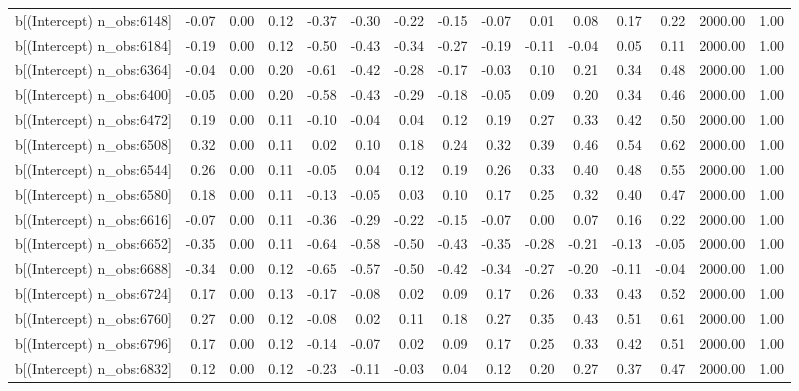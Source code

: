 \begin{table}[ht]
\begin{tabular}{rrrrrrrrrrrrrrr}
  b[(Intercept) n\_obs:6148] & -0.07 & 0.00 & 0.12 & -0.37 & -0.30 & -0.22 & -0.15 & -0.07 & 0.01 & 0.08 & 0.17 & 0.22 & 2000.00 & 1.00 \\ 
  b[(Intercept) n\_obs:6184] & -0.19 & 0.00 & 0.12 & -0.50 & -0.43 & -0.34 & -0.27 & -0.19 & -0.11 & -0.04 & 0.05 & 0.11 & 2000.00 & 1.00 \\ 
  b[(Intercept) n\_obs:6364] & -0.04 & 0.00 & 0.20 & -0.61 & -0.42 & -0.28 & -0.17 & -0.03 & 0.10 & 0.21 & 0.34 & 0.48 & 2000.00 & 1.00 \\ 
  b[(Intercept) n\_obs:6400] & -0.05 & 0.00 & 0.20 & -0.58 & -0.43 & -0.29 & -0.18 & -0.05 & 0.09 & 0.20 & 0.34 & 0.46 & 2000.00 & 1.00 \\ 
  b[(Intercept) n\_obs:6472] & 0.19 & 0.00 & 0.11 & -0.10 & -0.04 & 0.04 & 0.12 & 0.19 & 0.27 & 0.33 & 0.42 & 0.50 & 2000.00 & 1.00 \\ 
  b[(Intercept) n\_obs:6508] & 0.32 & 0.00 & 0.11 & 0.02 & 0.10 & 0.18 & 0.24 & 0.32 & 0.39 & 0.46 & 0.54 & 0.62 & 2000.00 & 1.00 \\ 
  b[(Intercept) n\_obs:6544] & 0.26 & 0.00 & 0.11 & -0.05 & 0.04 & 0.12 & 0.19 & 0.26 & 0.33 & 0.40 & 0.48 & 0.55 & 2000.00 & 1.00 \\ 
  b[(Intercept) n\_obs:6580] & 0.18 & 0.00 & 0.11 & -0.13 & -0.05 & 0.03 & 0.10 & 0.17 & 0.25 & 0.32 & 0.40 & 0.47 & 2000.00 & 1.00 \\ 
  b[(Intercept) n\_obs:6616] & -0.07 & 0.00 & 0.11 & -0.36 & -0.29 & -0.22 & -0.15 & -0.07 & 0.00 & 0.07 & 0.16 & 0.22 & 2000.00 & 1.00 \\ 
  b[(Intercept) n\_obs:6652] & -0.35 & 0.00 & 0.11 & -0.64 & -0.58 & -0.50 & -0.43 & -0.35 & -0.28 & -0.21 & -0.13 & -0.05 & 2000.00 & 1.00 \\ 
  b[(Intercept) n\_obs:6688] & -0.34 & 0.00 & 0.12 & -0.65 & -0.57 & -0.50 & -0.42 & -0.34 & -0.27 & -0.20 & -0.11 & -0.04 & 2000.00 & 1.00 \\ 
  b[(Intercept) n\_obs:6724] & 0.17 & 0.00 & 0.13 & -0.17 & -0.08 & 0.02 & 0.09 & 0.17 & 0.26 & 0.33 & 0.43 & 0.52 & 2000.00 & 1.00 \\ 
  b[(Intercept) n\_obs:6760] & 0.27 & 0.00 & 0.12 & -0.08 & 0.02 & 0.11 & 0.18 & 0.27 & 0.35 & 0.43 & 0.51 & 0.61 & 2000.00 & 1.00 \\ 
  b[(Intercept) n\_obs:6796] & 0.17 & 0.00 & 0.12 & -0.14 & -0.07 & 0.02 & 0.09 & 0.17 & 0.25 & 0.33 & 0.42 & 0.51 & 2000.00 & 1.00 \\ 
  b[(Intercept) n\_obs:6832] & 0.12 & 0.00 & 0.12 & -0.23 & -0.11 & -0.03 & 0.04 & 0.12 & 0.20 & 0.27 & 0.37 & 0.47 & 2000.00 & 1.00 \\ 

\end{tabular}
\end{table}
